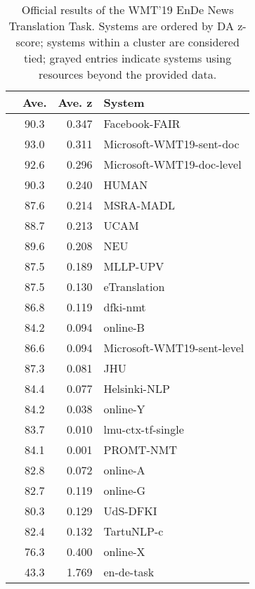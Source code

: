 \documentclass[11pt,a4paper]{article}
\newcommand{\entode}{EnDe}
\def\Const{\rowcolor{white}}
\def\UnCon{\rowcolor{lightgray}}
\begin{document}
\begin{table}[t]
\small
\centering
\begin{tabular}{ccrl}
 & Ave. & Ave. z & System\\ \hline
\Const{} & 90.3 & 0.347 & Facebook-FAIR \\ \hline
\Const{} & 93.0 & 0.311 & Microsoft-WMT19-sent-doc \\
\Const{} & 92.6 & 0.296 & Microsoft-WMT19-doc-level \\
\UnCon{} & 90.3 & 0.240 & HUMAN \\
\Const{} & 87.6 & 0.214 & MSRA-MADL \\
\Const{} & 88.7 & 0.213 & UCAM \\
\Const{} & 89.6 & 0.208 & NEU \\
\Const{} & 87.5 & 0.189 & MLLP-UPV \\
\Const{} & 87.5 & 0.130 & eTranslation \\
\Const{} & 86.8 & 0.119 & dfki-nmt \\
\UnCon{} & 84.2 & 0.094 & online-B \\
\Const{} & 86.6 & 0.094 & Microsoft-WMT19-sent-level \\
\Const{} & 87.3 & 0.081 & JHU \\
\Const{} & 84.4 & 0.077 & Helsinki-NLP \\
\UnCon{} & 84.2 & 0.038 & online-Y \\
\Const{} & 83.7 & 0.010 & lmu-ctx-tf-single \\
\UnCon{} & 84.1 & 0.001 & PROMT-NMT \\
\UnCon{} & 82.8 & 0.072 & online-A \\
\UnCon{} & 82.7 & 0.119 & online-G \\
\Const{} & 80.3 & 0.129 & UdS-DFKI \\
\Const{} & 82.4 & 0.132 & TartuNLP-c \\ \hline
\UnCon{} & 76.3 & 0.400 & online-X \\ \hline
\UnCon{} & 43.3 & 1.769 & en-de-task \\
\end{tabular}
\caption{Official results of the WMT'19 \entode{} News Translation Task. Systems are ordered by DA z-score; systems within a cluster are considered tied; grayed entries indicate systems using resources beyond the provided data.}
\label{tab:ende_human}
\end{table}




 
\end{document}
